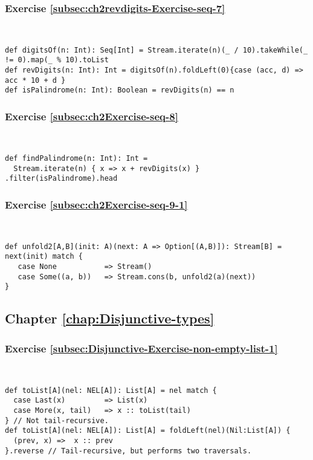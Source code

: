 \subsubsection*{Exercise \ref{subsec:ch2revdigits-Exercise-seq-7}}

~
\begin{lstlisting}
def digitsOf(n: Int): Seq[Int] = Stream.iterate(n)(_ / 10).takeWhile(_ != 0).map(_ % 10).toList
def revDigits(n: Int): Int = digitsOf(n).foldLeft(0){case (acc, d) => acc * 10 + d }
def isPalindrome(n: Int): Boolean = revDigits(n) == n
\end{lstlisting}


\subsubsection*{Exercise \ref{subsec:ch2Exercise-seq-8}}

~
\begin{lstlisting}
def findPalindrome(n: Int): Int = 
  Stream.iterate(n) { x => x + revDigits(x) } .filter(isPalindrome).head
\end{lstlisting}


\subsubsection*{Exercise \ref{subsec:ch2Exercise-seq-9-1}}

~
\begin{lstlisting}
def unfold2[A,B](init: A)(next: A => Option[(A,B)]): Stream[B] = next(init) match {
   case None           => Stream()
   case Some((a, b))   => Stream.cons(b, unfold2(a)(next))
}
\end{lstlisting}


\subsection*{Chapter \ref{chap:Disjunctive-types}}

\subsubsection*{Exercise \ref{subsec:Disjunctive-Exercise-non-empty-list-1}}

~
\begin{lstlisting}
def toList[A](nel: NEL[A]): List[A] = nel match {
  case Last(x)         => List(x)
  case More(x, tail)   => x :: toList(tail)
} // Not tail-recursive.
def toList[A](nel: NEL[A]): List[A] = foldLeft(nel)(Nil:List[A]) {
  (prev, x) =>  x :: prev
}.reverse // Tail-recursive, but performs two traversals.
\end{lstlisting}


